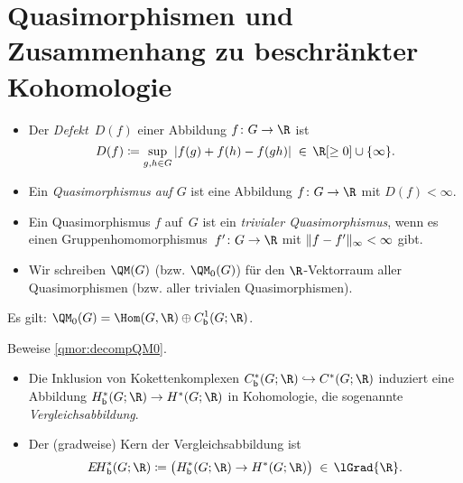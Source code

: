 \section{Quasimorphismen und Zusammenhang zu beschränkter Kohomologie}
\begin{thDef} \hfill
    \begin{itemize}
        \item
            Der \emph{Defekt~$D(f)$} einer Abbildung $f\colon G\to\R$
            ist
            \[ D(f) \defeq \sup_{g,h\in G}\, \abs{f(g) + f(h) - f(gh)}
                \;\in\, \R[\geq0] \cup \{\infty\}
            . \]
            
        \item
            Ein \emph{Quasimorphismus auf $G$} ist eine
            Abbildung $f\colon G\to\R$ mit $D(f) < \infty$.
            
        \item
            Ein Quasimorphismus $f$ auf~$G$ ist ein
            \emph{trivialer Quasimorphismus}, wenn es einen
            Gruppenhomomorphismus~$f'\colon G\to\R$ mit
            $\lVert f-f'\rVert_\infty < \infty$ gibt.
            
        \item
            Wir schreiben $\QM(G)$ (bzw. $\QM_0(G)$) für den $\R$-Vektorraum
            aller Quasimorphismen (bzw. aller trivialen Quasimorphismen). 
    \end{itemize}
\end{thDef}

\begin{thProposition}
    \label{qmor:decompQM0}%
    Es gilt: $\displaystyle\QM_0(G) = \Hom(G,\R) \oplus \Cb^1(G;\R)$.
\end{thProposition}

\begin{thAufgabe}
    Beweise \cref{qmor:decompQM0}.
\end{thAufgabe}

\begin{thErinnerDef} \hfill
    \begin{itemize}
        \item
            Die Inklusion von Kokettenkomplexen $\Cb^\ast(G;\R) \hookrightarrow
            C^\ast(G;\R)$ induziert eine Abbildung $\Hb^\ast(G;\R) \to
            H^\ast(G;\R)$ in Kohomologie, die sogenannte
            \emph{Vergleichsabbildung}.
        \item
            Der (gradweise) Kern der Vergleichsabbildung ist
            \[ \EHb^\ast(G;\R)
                \defeq \ker\bigl( \Hb^\ast(G;\R) \to H^\ast(G;\R) \bigr)
                \;\in\, \lGrad{\R}
            . \]
    \end{itemize}
\end{thErinnerDef}

